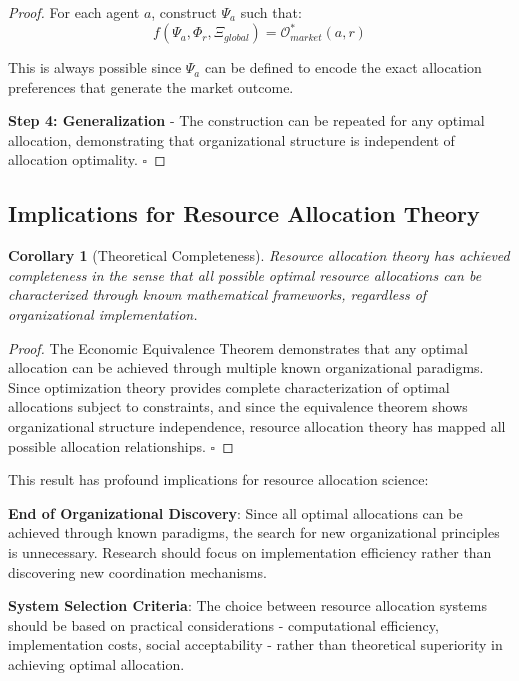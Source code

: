 \documentclass[12pt,a4paper]{article}
\newtheorem{corollary}[theorem]{Corollary}
\begin{document}
\begin{proof}
For each agent $a$, construct $\Psi_a$ such that:
\begin{equation}
f(\Psi_a, \Phi_r, \Xi_{global}) = \mathcal{O}^*_{market}(a,r)
\end{equation}

This is always possible since $\Psi_a$ can be defined to encode the exact allocation preferences that generate the market outcome.

\textbf{Step 4: Generalization} - The construction can be repeated for any optimal allocation, demonstrating that organizational structure is independent of allocation optimality. $\square$
\end{proof}

\subsection{Implications for Resource Allocation Theory}

\begin{corollary}[Theoretical Completeness]
Resource allocation theory has achieved completeness in the sense that all possible optimal resource allocations can be characterized through known mathematical frameworks, regardless of organizational implementation.
\end{corollary}



\begin{proof}
The Economic Equivalence Theorem demonstrates that any optimal allocation can be achieved through multiple known organizational paradigms. Since optimization theory provides complete characterization of optimal allocations subject to constraints, and since the equivalence theorem shows organizational structure independence, resource allocation theory has mapped all possible allocation relationships. $\square$
\end{proof}

This result has profound implications for resource allocation science:

\textbf{End of Organizational Discovery}: Since all optimal allocations can be achieved through known paradigms, the search for new organizational principles is unnecessary. Research should focus on implementation efficiency rather than discovering new coordination mechanisms.

\textbf{System Selection Criteria}: The choice between resource allocation systems should be based on practical considerations - computational efficiency, implementation costs, social acceptability - rather than theoretical superiority in achieving optimal allocation.
\end{document}
